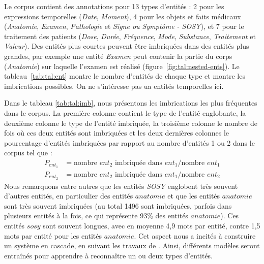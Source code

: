 Le corpus contient des annotations pour \num{13} types d'entités : \num{2} pour les expressions temporelles (\emph{Date}, \emph{Moment}), \num{4} pour les objets et faits médicaux (\emph{Anatomie}, \emph{Examen}, \emph{Pathologie} et \emph{Signe ou Symptôme - SOSY}), et \num{7} pour le traitement des patients (\emph{Dose}, \emph{Durée}, \emph{Fréquence}, \emph{Mode}, \emph{Substance}, \emph{Traitement} et \emph{Valeur}).
Des entités plus courtes peuvent être imbriquées dans des entités plus grandes, par exemple une entité \emph{Examen} peut contenir la partie du corps (\emph{Anatomie}) sur laquelle l'examen est réalisé (figure~\ref{fig:tal:nested-ents}).
Le tableau~\ref{tab:tal:ent} montre le nombre d'entités de chaque type et montre les imbrications possibles.
On ne s'intéresse pas ua entités temporelles ici.

Dans le tableau \ref{tab:tal:imb}, nous présentons les imbrications les plus fréquentes dans le corpus.
La première colonne contient le type de l'entité englobante, la deuxième colonne le type de l'entité imbriquée, la troisième colonne le nombre de fois où ces deux entités sont imbriquées et les deux dernières colonnes le pourcentage d'entités imbriquées par rapport au nombre d'entités 1 ou 2 dans le corpus tel que :
\begin{align*}
    P_{ent_1} & = \text{nombre } ent_2 \text{ imbriquée dans } ent_1 / \text{nombre } ent_1 \\
    P_{ent_2} & = \text{nombre } ent_2 \text{ imbriquée dans } ent_1 / \text{nombre } ent_2
\end{align*}
Nous remarquons entre autres que les entités \emph{SOSY} englobent très souvent d'autres entités, en particulier des entités $anatomie$ et que les entités $anatomie$ sont très souvent imbriquées (au total 1496 sont imbriquées, parfois dans plusieurs entités à la fois, ce qui représente 93\% des entités $anatomie$). Ces entités $sosy$ sont souvent longues, avec en moyenne 4,9 mots par entité, contre 1,5 mots par entité pour les entités $anatomie$.
Cet aspect nous a incités à construire un système en cascade, en suivant les travaux de \cite{alex-etal-2007-recognising}. Ainsi, différents modèles seront entraînés pour apprendre à reconnaître un ou deux types d'entités.

